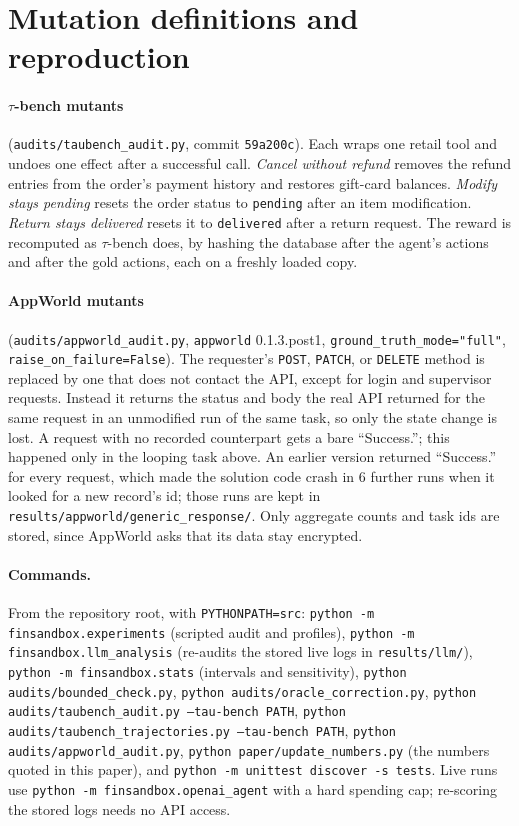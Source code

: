 \documentclass[11pt,a4paper]{article}
\begin{document}
\section{Mutation definitions and reproduction}
\label{app:repro}

\paragraph{$\tau$-bench mutants} (\texttt{audits/taubench\_audit.py}, commit \texttt{59a200c}). Each wraps one retail tool and undoes one effect after a successful call. \emph{Cancel without refund} removes the refund entries from the order's payment history and restores gift-card balances. \emph{Modify stays pending} resets the order status to \texttt{pending} after an item modification. \emph{Return stays delivered} resets it to \texttt{delivered} after a return request. The reward is recomputed as $\tau$-bench does, by hashing the database after the agent's actions and after the gold actions, each on a freshly loaded copy.

\paragraph{AppWorld mutants} (\texttt{audits/appworld\_audit.py}, \texttt{appworld} 0.1.3.post1, \texttt{ground\_truth\_mode="full"}, \texttt{raise\_on\_failure=False}). The requester's \texttt{POST}, \texttt{PATCH}, or \texttt{DELETE} method is replaced by one that does not contact the API, except for login and supervisor requests. Instead it returns the status and body the real API returned for the same request in an unmodified run of the same task, so only the state change is lost. A request with no recorded counterpart gets a bare ``Success.''; this happened only in the looping task above. An earlier version returned ``Success.'' for every request, which made the solution code crash in 6 further runs when it looked for a new record's id; those runs are kept in \texttt{results/appworld/generic\_response/}. Only aggregate counts and task ids are stored, since AppWorld asks that its data stay encrypted.

\paragraph{Commands.} From the repository root, with \texttt{PYTHONPATH=src}: \texttt{python -m finsandbox.experiments} (scripted audit and profiles), \texttt{python -m finsandbox.llm\_analysis} (re-audits the stored live logs in \texttt{results/llm/}), \texttt{python -m finsandbox.stats} (intervals and sensitivity), \texttt{python audits/bounded\_check.py}, \texttt{python audits/oracle\_correction.py}, \texttt{python audits/taubench\_audit.py --tau-bench PATH}, \texttt{python audits/taubench\_trajectories.py --tau-bench PATH}, \texttt{python audits/appworld\_audit.py}, \texttt{python paper/update\_numbers.py} (the numbers quoted in this paper), and \texttt{python -m unittest discover -s tests}. Live runs use \texttt{python -m finsandbox.openai\_agent} with a hard spending cap; re-scoring the stored logs needs no API access.
\end{document}
